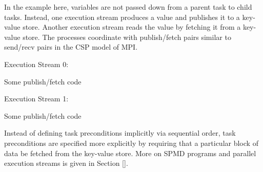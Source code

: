 In the example here, variables are not passed down from a parent task to child tasks.
Instead, one execution stream produces a value and publishes it to a key-value store.
Another execution stream reads the value by fetching it from a key-value store.
The processes coordinate with publish/fetch pairs similar to send/recv pairs in the CSP model of MPI.

\begin{minipage}{0.45\textwidth}
Execution Stream 0:
\begin{CppCode}
Some publish/fetch code
\end{CppCode}
\end{minipage}
\begin{minipage}{0.45\textwidth}
Execution Stream 1:
\begin{CppCode}
Some publish/fetch code
\end{CppCode}
\end{minipage}

Instead of defining task preconditions implicitly via sequential order,
task preconditions are specified more explicitly by requiring that a particular block of data be fetched from the key-value store.
More on SPMD programs and parallel execution streams is given in Section \ref{}.
